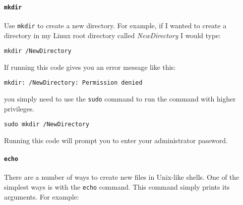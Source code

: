 \paragraph{{\tt{mkdir}}}

Use \texttt{mkdir} to create a new directory. For example, if I wanted to create a directory in my Linux root directory called {\emph{NewDirectory}} I would type:

\begin{knitrout}
\color{fgcolor}\begin{kframe}
\begin{verbatim}
mkdir /NewDirectory
\end{verbatim}
\end{kframe}
\end{knitrout}


\noindent If running this code gives you an error message like this:

\begin{knitrout}
\color{fgcolor}\begin{kframe}
\begin{verbatim}
mkdir: /NewDirectory: Permission denied
\end{verbatim}
\end{kframe}
\end{knitrout}


\noindent you simply need to use the \texttt{sudo} command to run the command with higher privileges. 

\begin{knitrout}
\color{fgcolor}\begin{kframe}
\begin{verbatim}
sudo mkdir /NewDirectory
\end{verbatim}
\end{kframe}
\end{knitrout}


\noindent Running this code will prompt you to enter your administrator password.

\paragraph{{\tt{echo}}}

There are a number of ways to create new files in Unix-like shells. One of the simplest ways is with the \texttt{echo} command. This command simply prints its arguments. For example:


